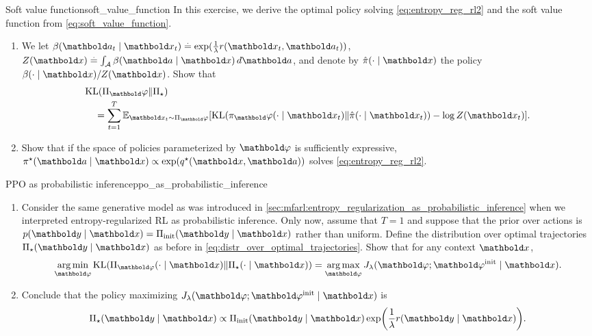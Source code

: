 \begin{nexercise}{Soft value function}{soft_value_function}
  In this exercise, we derive the optimal policy solving \cref{eq:entropy_reg_rl2} and the soft value function from \cref{eq:soft_value_function}.
  \begin{enumerate}
    \item We let $\beta(\va_t \mid \vx_t) \defeq \exp(\frac{1}{\lambda} r(\vx_t, \va_t))$, $Z(\vx) \defeq \int_\spA \beta(\va \mid \vx) \, d \va$, and denote by $\hat{\pi}(\cdot \mid \vx)$ the policy $\beta(\cdot \mid \vx) / Z(\vx)$.
    Show that \begin{align}
      \begin{multlined}
        \KL{\altpi_\vvarphi}{\altpi_\star} \\ = \sum_{t=1}^T \E[\vx_t \sim \altpi_\vvarphi]{\KL{\pi_\vvarphi(\cdot \mid \vx_t)}{\hat{\pi}(\cdot \mid \vx_t)} - \log Z(\vx_t)}.
      \end{multlined} \label{eq:entropy_reg_rl3}
    \end{align}

    \item Show that if the space of policies parameterized by $\vvarphi$ is sufficiently expressive, $\pis(\va \mid \vx) \propto \exp(\q*{\vx}{\va})$ solves \cref{eq:entropy_reg_rl2}.
  \end{enumerate}
\end{nexercise}

\begin{nexercise}{PPO as probabilistic inference}{ppo_as_probabilistic_inference}
  \begin{enumerate}
    \item Consider the same generative model as was introduced in \cref{sec:mfarl:entropy_regularization_as_probabilistic_inference} when we interpreted entropy-regularized RL as probabilistic inference.
    Only now, assume that $T=1$  and suppose that the prior over actions is $p(\vy \mid \vx) = \altpi_{\init}(\vy \mid \vx)$ rather than uniform.
    Define the distribution over optimal trajectories $\altpi_\star(\vy \mid \vx)$ as before in \cref{eq:distr_over_optimal_trajectories}.
    Show that for any context $\vx$, \begin{align}
      \argmin_{\vvarphi} \KL{\altpi_{\vvarphi}(\cdot \mid \vx)}{\altpi_\star(\cdot \mid \vx)} = \argmax_{\vvarphi} \j{\vvarphi; \vvarphi^{\init} \mid \vx}[\lambda].
    \end{align}

    \item Conclude that the policy maximizing $\j{\vvarphi; \vvarphi^{\init} \mid \vx}[\lambda]$ is \begin{align}
      \altpi_\star(\vy \mid \vx) \propto \altpi_{\init}(\vy \mid \vx) \exp\parentheses*{\frac{1}{\lambda} r(\vy \mid \vx)}.
    \end{align}
  \end{enumerate}
\end{nexercise}
